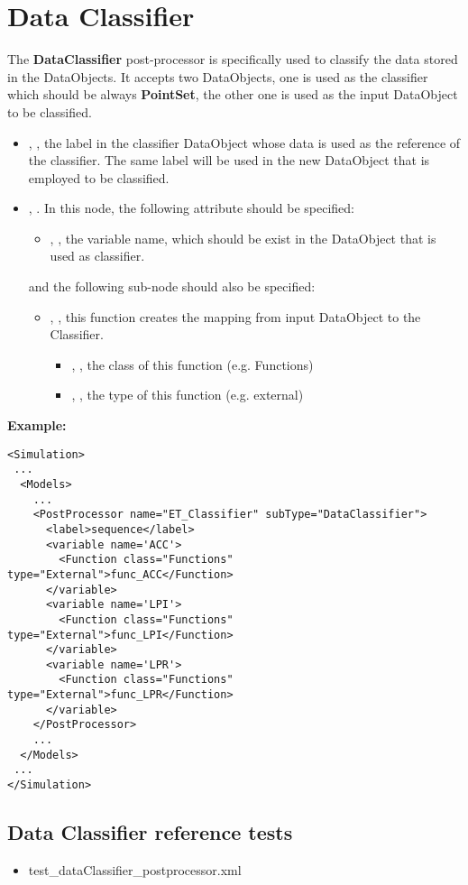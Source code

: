 \section{Data Classifier}
\label{sec:dataClassifier}

The \textbf{DataClassifier} post-processor is specifically used to classify the data stored in the DataObjects. It
accepts two DataObjects, one is used as the classifier which should be always \textbf{PointSet}, the other one is used
as the input DataObject to be classified. 
%
%
\begin{itemize}
  \item {}, , the label in the classifier DataObject whose data is used
    as the reference of the classifier. The same label will be used in the new DataObject that is employed to be
    classified.
  \item {}, . In this node, the following attribute should be specified: 
    \begin{itemize}
      \item {}, , the variable name, which should be exist in
        the DataObject that is used as classifier.
    \end{itemize}
    and the following sub-node should also be specified:
    \begin{itemize}
      \item {}, , this function creates the mapping from input DataObject
        to the Classifier.
        \begin{itemize}
          \item {}, , the class of this function (e.g. Functions)
          \item {}, , the type of this function (e.g. external)
        \end{itemize}
    \end{itemize}
\end{itemize}

\textbf{Example:}

\begin{lstlisting}[style=XML]
<Simulation>
 ...
  <Models>
    ...
    <PostProcessor name="ET_Classifier" subType="DataClassifier">
      <label>sequence</label>
      <variable name='ACC'>
        <Function class="Functions" type="External">func_ACC</Function>
      </variable>
      <variable name='LPI'>
        <Function class="Functions" type="External">func_LPI</Function>
      </variable>
      <variable name='LPR'>
        <Function class="Functions" type="External">func_LPR</Function>
      </variable>
    </PostProcessor>
    ...
  </Models>
 ...
</Simulation>
\end{lstlisting}

\subsection{Data Classifier reference tests}
\begin{itemize}
	\item test\_dataClassifier\_postprocessor.xml
\end{itemize}
